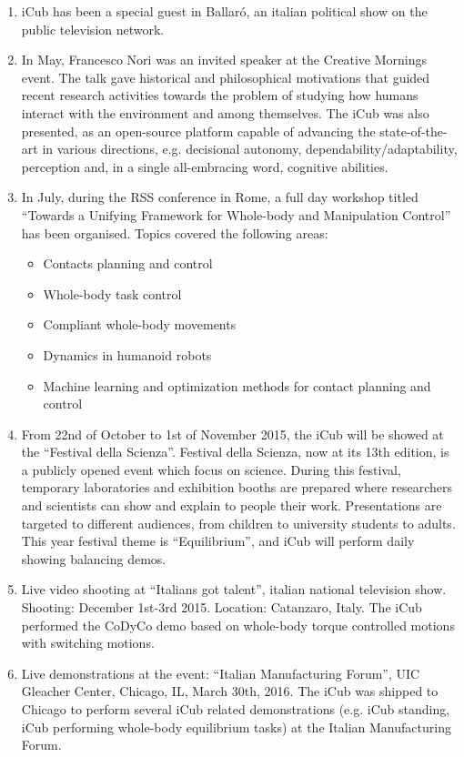 \begin{enumerate}
\item iCub has been a special guest in Ballar\'o, an italian political show on the public television network.

\item In May, Francesco Nori was an invited speaker at the Creative Mornings event. The talk gave historical and philosophical motivations that guided recent research activities towards the problem of studying how humans interact with the environment and among themselves. The iCub was also presented, as an open-source platform capable of advancing the state-of-the-art in various directions, e.g. decisional autonomy, dependability/adaptability, perception and, in a single all-embracing word, cognitive abilities.

\item In July, during the RSS conference in Rome, a full day workshop titled ``Towards a Unifying Framework for Whole-body and Manipulation Control'' has been organised. Topics covered the following areas:
\begin{itemize}
\item Contacts planning and control
\item Whole-body task control
\item Compliant whole-body movements
\item Dynamics in humanoid robots
\item Machine learning and optimization methods for contact planning and control
\end{itemize}

\item From 22nd of October to 1st of November 2015, the iCub will be showed at the ``Festival della Scienza''. Festival della Scienza, now at its 13th edition, is a publicly opened event which focus on science. During this festival, temporary laboratories and exhibition booths are prepared where researchers and scientists can show and explain to people their work. Presentations are targeted to different audiences, from children to university students to adults. This year festival theme is ``Equilibrium'', and iCub will perform daily showing balancing demos. 

\item Live video shooting at ``Italians got talent'', italian national television show. Shooting: December 1st-3rd 2015. Location: Catanzaro, Italy. The iCub performed the CoDyCo demo based on whole-body torque controlled motions with switching motions.

\item Live demonstrations at the event: ``Italian Manufacturing Forum'', UIC Gleacher Center, Chicago, IL, March 30th, 2016. The iCub was shipped to Chicago to perform several iCub related demonstrations (e.g. iCub standing, iCub performing whole-body equilibrium tasks) at the Italian Manufacturing Forum. 


\end{enumerate}

